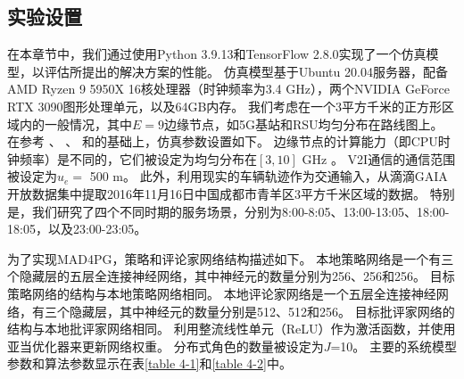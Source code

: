 \subsection{实验设置}

在本章节中，我们通过使用Python 3.9.13和TensorFlow 2.8.0实现了一个仿真模型，以评估所提出的解决方案的性能。
仿真模型基于Ubuntu 20.04服务器，配备AMD Ryzen 9 5950X 16核处理器（时钟频率为3.4 GHz），两个NVIDIA GeForce RTX 3090图形处理单元，以及64GB内存。
我们考虑在一个3平方千米的正方形区域内的一般情况，其中$E=9$边缘节点，如5G基站和RSU均匀分布在路线图上。
在参考 \cite{zhu2021decentralized}、 \cite{liu2021rtds}、 \cite{xu2021socially}和\cite{zhou2019computation}的基础上，仿真参数设置如下。
边缘节点的计算能力（即CPU时钟频率）是不同的，它们被设定为均匀分布在$[3, 10]$ GHz \cite{zhou2019computation}。 
V2I通信的通信范围被设定为$u_e =$ 500 m\cite{zhu2021decentralized}。
此外，利用现实的车辆轨迹作为交通输入，从滴滴GAIA开放数据集中提取2016年11月16日中国成都市青羊区3平方千米区域的数据。
特别是，我们研究了四个不同时期的服务场景，分别为8:00-8:05、13:00-13:05、18:00-18:05，以及23:00-23:05。

为了实现MAD4PG，策略和评论家网络结构描述如下。
本地策略网络是一个有三个隐藏层的五层全连接神经网络，其中神经元的数量分别为256、256和256。
目标策略网络的结构与本地策略网络相同。
本地评论家网络是一个五层全连接神经网络，有三个隐藏层，其中神经元的数量分别是512、512和256。
目标批评家网络的结构与本地批评家网络相同。
利用整流线性单元（ReLU）作为激活函数，并使用亚当优化器来更新网络权重。
分布式角色的数量被设定为$J$=10。
主要的系统模型参数和算法参数显示在表\ref{table 4-1}和\ref{table 4-2}中。

\begin{table}[h]
\centering
{}
\label{table 4-1}
\end{table}

